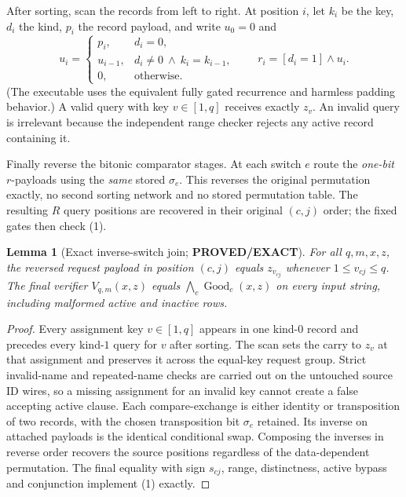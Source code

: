\documentclass[11pt]{article}
\newtheorem{lemma}[theorem]{Lemma}
\begin{document}
After sorting, scan the records from left to right. At position $i$,
let $k_i$ be the key, $d_i$ the kind, $p_i$ the record payload, and
write $u_0=0$ and
\[
 u_i=\begin{cases}
 p_i,&d_i=0,\\
 u_{i-1},&d_i\ne0\ \land\ k_i=k_{i-1},\\
 0,&\text{otherwise}.
 \end{cases}\qquad
 r_i=[d_i=1]\land u_i.
 \tag{3}
\]
(The executable uses the equivalent fully gated recurrence and harmless
padding behavior.) A valid query with key $v\in[1,q]$ receives exactly
$z_v$. An invalid query is irrelevant because the independent range
checker rejects any active record containing it.

Finally reverse the bitonic comparator stages. At each switch $e$ route
the \emph{one-bit} $r$-payloads using the \emph{same} stored $\sigma_e$.
This reverses the original permutation exactly, no second sorting network
and no stored permutation table. The resulting $R$ query positions are
recovered in their original $(c,j)$ order; the fixed gates then check (1).

\begin{lemma}[Exact inverse-switch join; \textbf{PROVED/EXACT}]
For all $q,m,x,z$, the reversed request payload in position $(c,j)$
equals $z_{v_{cj}}$ whenever $1\le v_{cj}\le q$. The final verifier
$V_{q,m}(x,z)$ equals $\bigwedge_c\operatorname{Good}_c(x,z)$ on
\emph{every} input string, including malformed active and inactive rows.
\end{lemma}
\begin{proof}
Every assignment key $v\in[1,q]$ appears in one kind-$0$ record and
precedes every kind-$1$ query for $v$ after sorting. The scan sets the
carry to $z_v$ at that assignment and preserves it across the equal-key
request group. Strict invalid-name and repeated-name checks are carried
out on the untouched source ID wires, so a missing assignment for an
invalid key cannot create a false accepting active clause.
Each compare-exchange is either identity or transposition of two records,
with the chosen transposition bit $\sigma_e$ retained. Its inverse on
attached payloads is the identical conditional swap. Composing the
inverses in reverse order recovers the source positions regardless of
the data-dependent permutation. The final equality with sign $s_{cj}$,
range, distinctness, active bypass and conjunction implement (1) exactly.
\end{proof}
\end{document}
